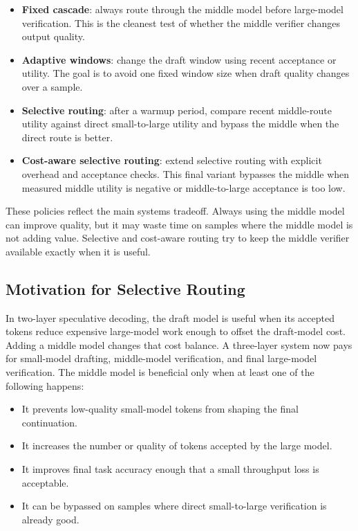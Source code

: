 \documentclass[11pt]{article}
\begin{document}
\begin{itemize}
  \item \textbf{Fixed cascade}: always route through the middle model before large-model verification. This is the cleanest test of whether the middle verifier changes output quality.
  \item \textbf{Adaptive windows}: change the draft window using recent acceptance or utility. The goal is to avoid one fixed window size when draft quality changes over a sample.
  \item \textbf{Selective routing}: after a warmup period, compare recent middle-route utility against direct small-to-large utility and bypass the middle when the direct route is better.
  \item \textbf{Cost-aware selective routing}: extend selective routing with explicit overhead and acceptance checks. This final variant bypasses the middle when measured middle utility is negative or middle-to-large acceptance is too low.
\end{itemize}

These policies reflect the main systems tradeoff. Always using the middle model can improve quality, but it may waste time on samples where the middle model is not adding value. Selective and cost-aware routing try to keep the middle verifier available exactly when it is useful.

\subsection{Motivation for Selective Routing}

In two-layer speculative decoding, the draft model is useful when its accepted tokens reduce expensive large-model work enough to offset the draft-model cost. Adding a middle model changes that cost balance. A three-layer system now pays for small-model drafting, middle-model verification, and final large-model verification. The middle model is beneficial only when at least one of the following happens:

\begin{itemize}
  \item It prevents low-quality small-model tokens from shaping the final continuation.
  \item It increases the number or quality of tokens accepted by the large model.
  \item It improves final task accuracy enough that a small throughput loss is acceptable.
  \item It can be bypassed on samples where direct small-to-large verification is already good.
\end{itemize}
\end{document}
